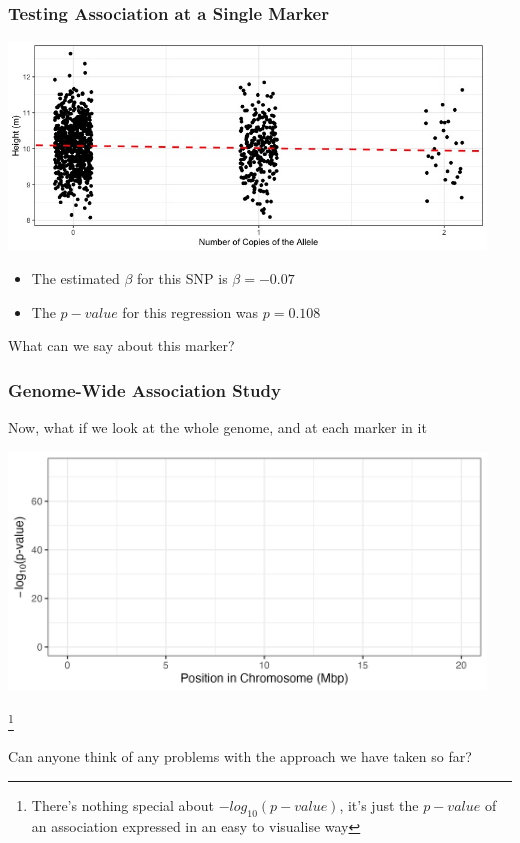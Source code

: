 \documentclass[xcolor=dvipsnames]{beamer}
\newcommand\blfootnote[1]{%
	\begingroup
	\renewcommand\thefootnote{}\footnote{#1}%
	\addtocounter{footnote}{-1}%
	\endgroup
}
\begin{document}
\begin{frame}
	\frametitle{Testing Association at a Single Marker}
	
	\includegraphics[keepaspectratio, width  = 0.95\textwidth]{img/snp_mod_line}				

\begin{itemize}
	\item[]	The estimated $\beta$ for this SNP is $\beta=-0.07$
	\item[] The $p-value$ for this regression was $p=0.108$
\end{itemize}
\pause 
\vspace{10pt}
\centering \Large What can we say about this marker?


\end{frame}


\begin{frame}
	\frametitle{Genome-Wide Association Study}
	Now, what if we look at the whole genome, and at each marker in it \pause
	
		\includegraphics[keepaspectratio, width  = 0.95\textwidth]{img/uncorPlot_noData}				
		
\blfootnote{There's nothing special about $-log_{10}(p-value)$, it's just the $p-value$ of an association expressed in an easy to visualise way}
\end{frame}

\begin{frame}
	
	Can anyone think of any problems with the approach we have taken so far?

\end{frame}
\end{document}

